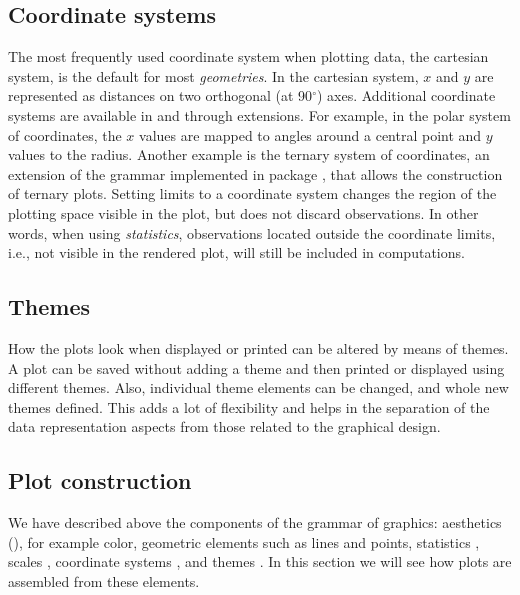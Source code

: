\documentclass[krantz2]{krantz}\usepackage{knitr}
\begin{document}
\subsection{Coordinate systems}

The most frequently used coordinate system when plotting data, the cartesian system, is the default for most \emph{geometries}. In the cartesian system, $x$ and $y$ are represented as distances on two orthogonal (at 90$^\circ$) axes. Additional coordinate systems are available in  and through extensions. For example, in the polar system of coordinates, the $x$ values are mapped to angles around a central point and $y$ values to the radius. Another example is the ternary system of coordinates, an extension of the grammar implemented in package , that allows the construction of ternary plots. Setting limits to a coordinate system changes the region of the plotting space visible in the plot, but does not discard observations. In other words, when using \emph{statistics}, observations located outside the coordinate limits, i.e., not visible in the rendered plot, will still be included in computations.

\subsection{Themes}

How the plots look when displayed or printed can be altered by means of themes. A plot can be saved without adding a theme and then printed or displayed using different themes. Also, individual theme elements can be changed, and whole new themes defined. This adds a lot of flexibility and helps in the separation of the data representation aspects from those related to the graphical design.

\subsection{Plot construction}
We have described above the components of the grammar of graphics: aesthetics (), for example color, geometric elements  such as lines and points, statistics , scales , coordinate systems , and themes . In this section we will see how plots are assembled from these elements.
\end{document}
